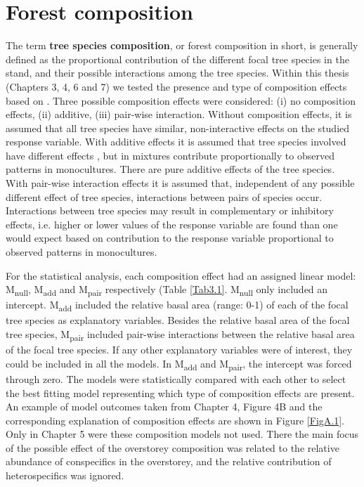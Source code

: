 \documentclass[b5paper,10pt]{book} %
\begin{document}
	\section{Forest composition}

	The term \textbf{tree species composition}, or forest composition in short, is generally defined as the proportional contribution of the different focal tree species in the stand, and their possible interactions among the tree species. Within this thesis (Chapters 3, 4, 6 and 7) we tested the presence and type of composition effects based on \citet{Kirwan2009}. Three possible composition effects were considered: (i) no composition effects, (ii) additive, (iii) pair-wise interaction. Without composition effects, it is assumed that all tree species have similar, non-interactive effects on the studied response variable. With additive effects it is assumed that tree species involved have different effects , but in mixtures contribute proportionally to observed patterns in monocultures. There are pure additive effects of the tree species. With pair-wise interaction effects it is assumed that, independent of any possible different effect of tree species, interactions between pairs of species occur. Interactions between tree species may result in complementary or inhibitory effects, i.e. higher or lower values of the response variable are found than one would expect based on contribution to the response variable proportional to observed patterns in monocultures. 

	For the statistical analysis, each composition effect had an assigned linear model: M\textsubscript{null}, M\textsubscript{add} and M\textsubscript{pair} respectively (Table \ref{Tab3.1}. M\textsubscript{null} only included an intercept. M\textsubscript{add} included the relative basal area (range: 0-1) of each of the focal tree species as explanatory variables. Besides the relative basal area of the focal tree species, M\textsubscript{pair} included pair-wise interactions between the relative basal area of the focal tree species. If any other explanatory variables were of interest, they could be included in all the models. In M\textsubscript{add} and M\textsubscript{pair}, the intercept was forced through zero. The models were statistically compared with each other to select the best fitting model representing which type of composition effects are present. An example of model outcomes taken from Chapter 4, Figure 4B and the corresponding explanation of composition effects are shown in Figure \ref{FigA.1}. Only in Chapter 5 were these composition models not used. There the main focus of the possible effect of the overstorey composition was related to the relative abundance of conspecifics in the overstorey, and the relative contribution of heterospecifics was ignored.
\end{document}
